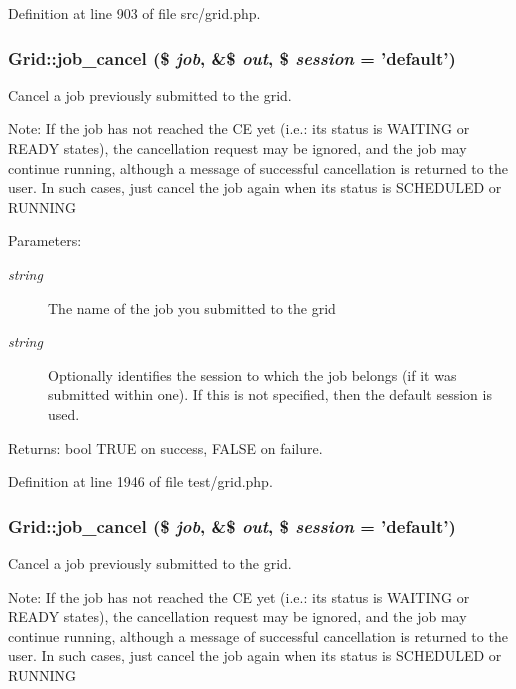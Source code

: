 Definition at line 903 of file src/grid.php.
\subsubsection{\setlength{\rightskip}{0pt plus 5cm}Grid::job\_\-cancel (\$ {\em job}, \&\$ {\em out}, \$ {\em session} = 'default')}\label{classGrid_a51}


Cancel a job previously submitted to the grid. 

Note: If the job has not reached the CE yet (i.e.: its status is WAITING or READY states), the cancellation request may be ignored, and the job may continue running, although a message of successful cancellation is returned to the user. In such cases, just cancel the job again when its status is SCHEDULED or RUNNING

\begin{Desc}
\item[Parameters:]
\begin{description}
\item[{\em string}]The name of the job you submitted to the grid \item[{\em string}]Optionally identifies the session to which the job belongs (if it was submitted within one). If this is not specified, then the default session is used. \end{description}
\end{Desc}
\begin{Desc}
\item[Returns:]bool TRUE on success, FALSE on failure. \end{Desc}


Definition at line 1946 of file test/grid.php.
\subsubsection{\setlength{\rightskip}{0pt plus 5cm}Grid::job\_\-cancel (\$ {\em job}, \&\$ {\em out}, \$ {\em session} = 'default')}\label{classGrid_a25}


Cancel a job previously submitted to the grid. 

Note: If the job has not reached the CE yet (i.e.: its status is WAITING or READY states), the cancellation request may be ignored, and the job may continue running, although a message of successful cancellation is returned to the user. In such cases, just cancel the job again when its status is SCHEDULED or RUNNING

